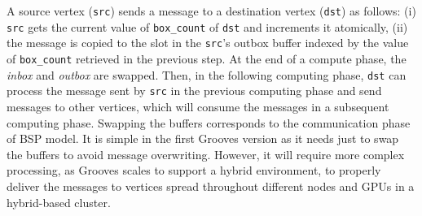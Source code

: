 A source vertex (\texttt{src}) sends a message to a destination vertex (\texttt{dst}) as follows: (i) \texttt{src} gets the current value of \texttt{box\_count} of \texttt{dst} and increments it atomically, (ii) the message is copied to the slot in the \texttt{src}’s outbox buffer indexed by the value of \texttt{box\_count} retrieved in the previous step. At the end of a compute phase, the \emph{inbox} and \emph{outbox} are swapped. Then, in the following computing phase, \texttt{dst} can process the message sent by \texttt{src} in the previous computing phase and send messages to other vertices, which will consume the messages in a subsequent computing phase. Swapping the buffers corresponds to the communication phase of BSP model. It is simple in the first Grooves version as it needs just to swap the buffers to avoid message overwriting. However, it will require more complex processing, as Grooves scales to support a hybrid environment, to properly deliver the messages to vertices spread throughout different nodes and GPUs in a hybrid-based cluster. 

